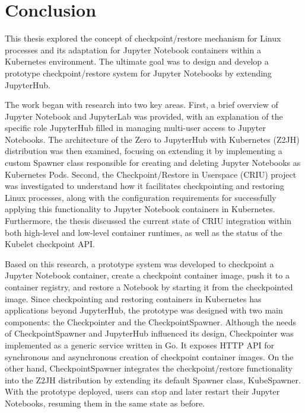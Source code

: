 \documentclass[
  digital,     %
  oneside,     %
  nosansbold,  %
  nocolorbold, %
  lof,         %
  nolot,         %
]{fithesis4}
\begin{document}
\chapter{Conclusion}

This thesis explored the concept of checkpoint/restore mechanism for Linux processes and its adaptation for Jupyter Notebook containers within a Kubernetes environment. The ultimate goal was to design and develop a prototype checkpoint/restore system for Jupyter Notebooks by extending JupyterHub.

The work began with research into two key areas. First, a brief overview of Jupyter Notebook and JupyterLab was provided, with an explanation of the specific role JupyterHub filled in managing multi-user access to Jupyter Notebooks. The architecture of the Zero to JupyterHub with Kubernetes (Z2JH) distribution was then examined, focusing on extending it by implementing a custom Spawner class responsible for creating and deleting Jupyter Notebooks as Kubernetes Pods. Second, the Checkpoint/Restore in Userspace (CRIU) project was investigated to understand how it facilitates checkpointing and restoring Linux processes, along with the configuration requirements for successfully applying this functionality to Jupyter Notebook containers in Kubernetes. Furthermore, the thesis discussed the current state of CRIU integration within both high-level and low-level container runtimes, as well as the status of the Kubelet checkpoint API.

Based on this research, a prototype system was developed to checkpoint a Jupyter Notebook container, create a checkpoint container image, push it to a container registry, and restore a Notebook by starting it from the checkpointed image. Since checkpointing and restoring containers in Kubernetes has applications beyond JupyterHub, the prototype was designed with two main components: the Checkpointer and the CheckpointSpawner. Although the needs of CheckpointSpawner and JupyterHub influenced its design, Checkpointer was implemented as a generic service written in Go. It exposes HTTP API for synchronous and asynchronous creation of checkpoint container images. On the other hand, CheckpointSpawner integrates the checkpoint/restore functionality into the Z2JH distribution by extending its default Spawner class, KubeSpawner. With the prototype deployed, users can stop and later restart their Jupyter Notebooks, resuming them in the same state as before.



\printbibliography[heading=bibintoc] %
\end{document}
